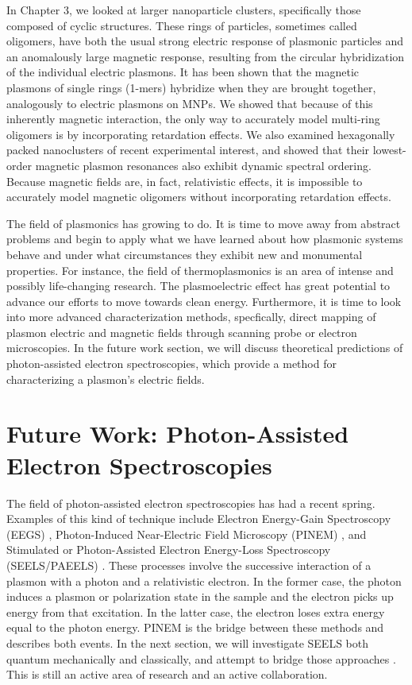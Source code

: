 \documentclass [11pt, proquest] {uwthesis}[2016/11/22]
\begin{document}
In Chapter 3, we looked at larger nanoparticle clusters, specifically those composed of cyclic structures. These rings of particles, sometimes called oligomers, have both the usual strong electric response of plasmonic particles and an anomalously large magnetic response, resulting from the circular hybridization of the individual electric plasmons. It has been shown that the magnetic plasmons of single rings (1-mers) hybridize when they are brought together, analogously to electric plasmons on MNPs. We showed that because of this inherently magnetic interaction, the only way to accurately model multi-ring oligomers is by incorporating retardation effects. We also examined hexagonally packed nanoclusters of recent experimental interest, and showed that their lowest-order magnetic plasmon resonances also exhibit dynamic spectral ordering. Because magnetic fields are, in fact, relativistic effects, it is impossible to accurately model magnetic oligomers without incorporating retardation effects.

The field of plasmonics has growing to do. It is time to move away from abstract problems and begin to apply what we have learned about how plasmonic systems behave and under what circumstances they exhibit new and monumental properties. For instance, the field of thermoplasmonics is an area of intense and possibly life-changing research. The plasmoelectric effect has great potential to advance our efforts to move towards clean energy. Furthermore, it is time to look into more advanced characterization methods, specfically, direct mapping of plasmon electric and magnetic fields through scanning probe or electron microscopies. In the future work section, we will discuss theoretical predictions of photon-assisted electron spectroscopies, which provide a method for characterizing a plasmon's electric fields.

\section{Future Work: Photon-Assisted Electron Spectroscopies}

The field of photon-assisted electron spectroscopies has had a recent spring. Examples of this kind of technique include Electron Energy-Gain Spectroscopy (EEGS) \cite{EEGS} , Photon-Induced Near-Electric Field Microscopy (PINEM) \cite{PINEM}, and Stimulated or Photon-Assisted Electron Energy-Loss Spectroscopy (SEELS/PAEELS) \cite{EEGS,vanAiken}. These processes involve the successive interaction of a plasmon with a photon and a relativistic electron. In the former case, the photon induces a plasmon or polarization state in the sample and the electron picks up energy from that excitation. In the latter case, the electron loses extra energy equal to the photon energy. PINEM is the bridge between these methods and describes both events. In the next section, we will investigate SEELS both quantum mechanically and classically, and attempt to bridge those approaches \cite{AbajoRevMod,vanAiken,EEGS}. This is still an active area of research and an active collaboration.
\end{document}
